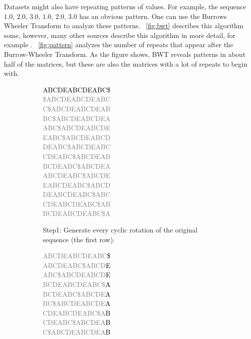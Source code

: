 Datasets might also have repeating patterns of values. For example, the sequence $1.0$, $2.0$, $3.0$, $1.0$, $2.0$, $3.0$ has an obvious pattern. One can use the Burrows Wheeler Transform\cite{prelim:burrows} to analyze these patterns. \figurename~\ref{fig:bwt} describes this algorithm some, however, many other sources describe this algorithm in more detail, for example \cite{prelim:burrows,prelim:salomon}. \figurename~\ref{fig:pattern} analyzes the number of repeats that appear after the Burrow-Wheeler Transform. As the figure shows, BWT reveals patterns in about half of the matrices, but these are also the matrices with a lot of repeats to begin with.
\begin{figure}
\center
\begin{subfigure}{.3\linewidth}
\footnotesize
\textcolor{gray}{
\textcolor{black}{ABCDEABCDEABC\$}\\
\$ABCDEABCDEABC\\
C\$ABCDEABCDEAB\\
BC\$ABCDEABCDEA\\
ABC\$ABCDEABCDE\\
EABC\$ABCDEABCD\\
DEABC\$ABCDEABC\\
CDEABC\$ABCDEAB\\
BCDEABC\$ABCDEA\\
ABCDEABC\$ABCDE\\
EABCDEABC\$ABCD\\
DEABCDEABC\$ABC\\
CDEABCDEABC\$AB\\
BCDEABCDEABC\$A\\
}
\caption{Step1: Generate every cyclic rotation of the original sequence (the first row).}
\label{fig:bwtStep1}
\end{subfigure}
\begin{subfigure}{.3\linewidth}
\footnotesize
\textcolor{gray}{
ABCDEABCDEABC\textcolor{black}{\$}\\
ABCDEABC\$ABCD\textcolor{black}{E}\\
ABC\$ABCDEABCD\textcolor{black}{E}\\
BCDEABCDEABC\$\textcolor{black}{A}\\
BCDEABC\$ABCDE\textcolor{black}{A}\\
BC\$ABCDEABCDE\textcolor{black}{A}\\
CDEABCDEABC\$A\textcolor{black}{B}\\
CDEABC\$ABCDEA\textcolor{black}{B}\\
C\$ABCDEABCDEA\textcolor{black}{B}\\
}
\end{subfigure}
\end{figure}
